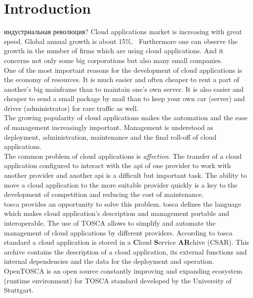 
\chapter{Introduction}
индустриальная революция?
\fi
Cloud applications market is increasing with great speed. 
Global annual growth is about 15\%.~\cite*{statista_global}
Furthermore one can observe the growth in the number of firms which are using cloud applications. 
And it concerns not only some big corporations but also many small companies.~\cite*{destatis_2014, destatis_2016} \\ 
One of the most important reasons for the development of cloud applications is the economy of resources.
It is much easier and often cheaper to rent a part of another's big mainframe than to maintain one's own server.
It is also easier and cheaper to send a small package by mail than to keep your own car (server) and driver (administrator) for rare traffic as well.\\ 
The growing popularity of cloud applications makes the automation and the ease of management increasingly important.
Management is understood as deployment, administration, maintenance and the final roll-off of cloud applications.\\
The common problem of cloud applications is \emph{affection}. 
The transfer of a cloud application configured to interact with the \gls{api} of one provider to work with another provider and another \gls{api} is a difficult but important task. 
The ability to move a cloud application to the more suitable provider quickly is a key to the development of competition and reducing the cost of maintenance.\\ %
\gls{tosca} \cite*{TOSCA-v1.0} provides an opportunity to solve this problem. 
\gls{tosca} defines the language which makes cloud application's description and management portable and interoperable. 
The use of TOSCA allows to simplify and automate the management of cloud applications by different providers. 
According to \gls{tosca} standard a cloud application is stored in a \textbf{C}loud \textbf{S}ervice \textbf{AR}chive (CSAR).
This archive contains the description of a cloud application, its external functions and internal dependencies and the data for the deployment and operation.\\
OpenTOSCA \cite*{OpenTOSCA} is an open source constantly improving and expanding ecosystem (runtime environment) for TOSCA standard developed by the University of Stuttgart.
